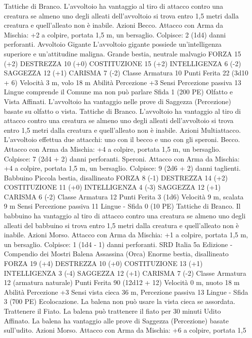 \begin{multicols}{2}
Tattiche di Branco. L’avvoltoio ha vantaggio al tiro di attacco
contro una creatura se almeno uno degli alleati dell’avvoltoio si
trova entro 1,5 metri dalla creatura e quell’alleato non è inabile.
Azioni
Becco. Attacco con Arma da Mischia: +2 a colpire, portata 1,5
m, un bersaglio.
Colpisce: 2 (1d4) danni perforanti.
Avvoltoio Gigante
L’avvoltoio gigante possiede un’intelligenza superiore e
un’attitudine maligna.
Grande bestia, neutrale malvagio
FORZA 15 (+2)
DESTREZZA 10 (+0)
COSTITUZIONE 15 (+2)
INTELLIGENZA 6 (-2)
SAGGEZZA 12 (+1)
CARISMA 7 (-2)
Classe Armatura 10
Punti Ferita 22 (3d10 + 6)
Velocità 3 m, volo 18 m
Abilità Percezione +3
Sensi Percezione passiva 13
Lingue comprende il Comune ma non può parlare
Sfida 1 (200 PE)
Olfatto e Vista Affinati. L’avvoltoio ha vantaggio nelle prove di
Saggezza (Percezione) basate su olfatto o vista.
Tattiche di Branco. L’avvoltoio ha vantaggio al tiro di attacco
contro una creatura se almeno uno degli alleati dell’avvoltoio si
trova entro 1,5 metri dalla creatura e quell’alleato non è inabile.
Azioni
Multiattacco. L’avvoltoio effettua due attacchi: uno con il becco
e uno con gli speroni.
Becco. Attacco con Arma da Mischia: +4 a colpire, portata 1,5
m, un bersaglio.
Colpisce: 7 (2d4 + 2) danni perforanti.
Speroni. Attacco con Arma da Mischia: +4 a colpire, portata 1,5
m, un bersaglio.
Colpisce: 9 (2d6 + 2) danni taglienti.
Babbuino
Piccola bestia, disallineato
FORZA 8 (-1)
DESTREZZA 14 (+2)
COSTITUZIONE 11 (+0)
INTELLIGENZA 4 (-3)
SAGGEZZA 12 (+1)
CARISMA 6 (-2)
Classe Armatura 12
Punti Ferita 3 (1d6)
Velocità 9 m, scalata 9 m
Sensi Percezione passiva 11
Lingue -
Sfida 0 (10 PE)
Tattiche di Branco. Il babbuino ha vantaggio al tiro di attacco
contro una creatura se almeno uno degli alleati del babbuino si
trova entro 1,5 metri dalla creatura e quell’alleato non è inabile.
Azioni
Morso. Attacco con Arma da Mischia: +1 a colpire, portata 1,5
m, un bersaglio.
Colpisce: 1 (1d4 - 1) danni perforanti.
SRD Italia 5a Edizione - Compendio dei Mostri
Balena Assassina
(Orca)
Enorme bestia, disallineato
FORZA 19 (+4)
DESTREZZA 10 (+0)
COSTITUZIONE 13 (+1)
INTELLIGENZA 3 (-4)
SAGGEZZA 12 (+1)
CARISMA 7 (-2)
Classe Armatura 12 (armatura naturale)
Punti Ferita 90 (12d12 + 12)
Velocità 0 m, nuoto 18 m
Abilità Percezione +3
Sensi vista cieca 36 m, Percezione passiva 13
Lingue -
Sfida 3 (700 PE)
Ecolocazione. La balena non può usare la vista cieca se
assordata.
Trattenere il Fiato. La balena può trattenere il fiato per 30
minuti
Udito Affinato. La balena ha vantaggio alle prove di Saggezza
(Percezione) basate sull’udito.
Azioni
Morso. Attacco con Arma da Mischia: +6 a colpire, portata 1,5

\end{multicols}

